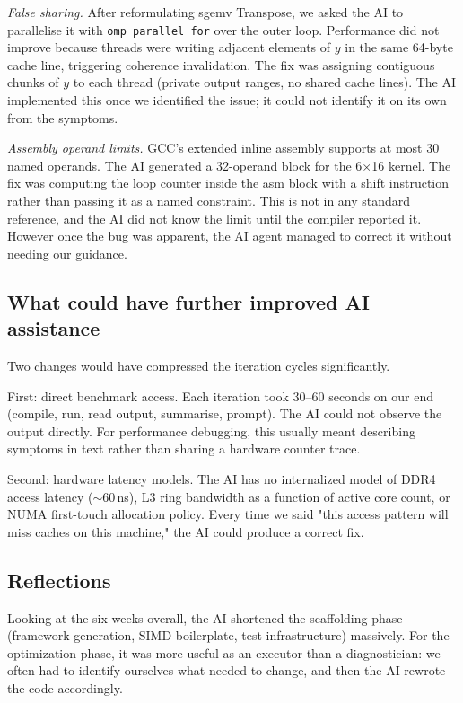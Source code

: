 \documentclass[11pt,a4paper]{article}
\begin{document}
\textit{False sharing.}
After reformulating sgemv Transpose, we asked the AI to parallelise it with
\texttt{omp parallel for} over the outer loop.
Performance did not improve because threads were writing adjacent elements of $y$ in the same 64-byte cache
line, triggering coherence invalidation.
The fix was assigning contiguous chunks of $y$ to each thread
(private output ranges, no shared cache lines).
The AI implemented this once we identified the issue; it could not identify it on its own
from the symptoms.

\textit{Assembly operand limits.}
GCC's extended inline assembly supports at most 30 named operands.
The AI generated a 32-operand block for the 6$\times$16 kernel.
The fix was computing the loop counter inside the asm block with a shift
instruction rather than passing it as a named constraint.
This is not in any standard reference, and the AI did not know the limit
until the compiler reported it. However once the bug was apparent, the AI agent managed to correct it without needing our guidance.

\subsection*{What could have further improved AI assistance}

Two changes would have compressed the iteration cycles significantly.

First: direct benchmark access.
Each iteration took 30--60 seconds on our end (compile, run, read output,
summarise, prompt).
The AI could not observe the output directly.
For performance debugging, this usually meant describing symptoms in text rather
than sharing a hardware counter trace.

Second: hardware latency models.
The AI has no internalized model of DDR4 access latency ($\sim$60\,ns),
L3 ring bandwidth as a function of active core count, or NUMA first-touch
allocation policy.
Every time we said "this access pattern will miss caches on this machine,"
the AI could produce a correct fix.

\subsection*{Reflections}

Looking at the six weeks overall, the AI shortened the scaffolding phase
(framework generation, SIMD boilerplate, test infrastructure) massively.
For the optimization phase, it was more useful as an executor than a diagnostician:
we often had to identify ourselves what needed to change, and then the AI rewrote the code accordingly.
\end{document}
